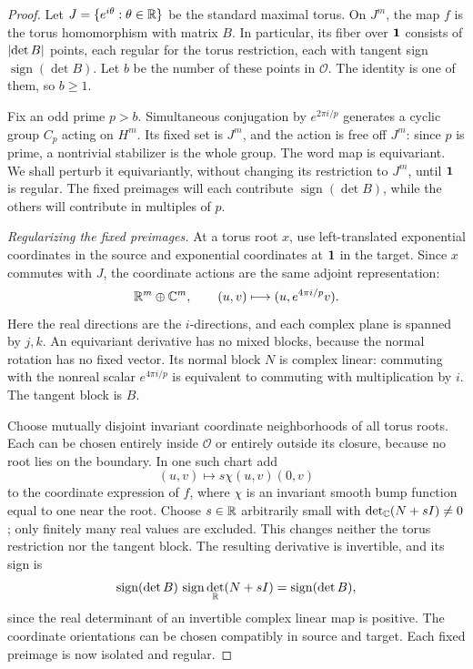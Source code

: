 \begin{proof}
Let $J=\{e^{i\theta}:\theta\in\mathbb R\}$ be the standard maximal torus. On $J^m$, the map $f$ is the torus homomorphism with matrix $B$. In particular, its fiber over $\mathbf 1$ consists of $\left\lvert\det B\right\rvert$ points, each regular for the torus restriction, each with tangent sign $\operatorname{sign}(\det B)$. Let $b$ be the number of these points in $\mathcal O$. The identity is one of them, so $b\ge1$.

Fix an odd prime $p>b$. Simultaneous conjugation by $e^{2\pi i/p}$ generates a cyclic group $C_p$ acting on $H^m$. Its fixed set is $J^m$, and the action is free off $J^m$: since $p$ is prime, a nontrivial stabilizer is the whole group. The word map is equivariant. We shall perturb it equivariantly, without changing its restriction to $J^m$, until $\mathbf 1$ is regular. The fixed preimages will each contribute $\operatorname{sign}(\det B)$, while the others will contribute in multiples of $p$.

\smallskip
\noindent\emph{Regularizing the fixed preimages.}
At a torus root $x$, use left-translated exponential coordinates in the source and exponential coordinates at $\mathbf 1$ in the target. Since $x$ commutes with $J$, the coordinate actions are the same adjoint representation:
\[
 \R^m\oplus\C^m,
 \qquad (u,v)\longmapsto (u,e^{4\pi i/p}v).
\]
Here the real directions are the $i$-directions, and each complex plane is spanned by $j,k$. An equivariant derivative has no mixed blocks, because the normal rotation has no fixed vector. Its normal block $N$ is complex linear: commuting with the nonreal scalar $e^{4\pi i/p}$ is equivalent to commuting with multiplication by $i$. The tangent block is $B$.

Choose mutually disjoint invariant coordinate neighborhoods of all torus roots. Each can be chosen entirely inside $\mathcal O$ or entirely outside its closure, because no root lies on the boundary. In one such chart add
\[
 (u,v)\longmapsto s\chi(u,v)(0,v)
\]
to the coordinate expression of $f$, where $\chi$ is an invariant smooth bump function equal to one near the root. Choose $s\in\mathbb R$ arbitrarily small with $\det_{\mathbb C}(N+sI)\ne0$; only finitely many real values are excluded. This changes neither the torus restriction nor the tangent block. The resulting derivative is invertible, and its sign is
\[
 \operatorname{sign}(\det B)\,
 \operatorname{sign}\det_{\mathbb R}(N+sI)
 =\operatorname{sign}(\det B),
\]
since the real determinant of an invertible complex linear map is positive. The coordinate orientations can be chosen compatibly in source and target. Each fixed preimage is now isolated and regular.


\end{proof}
